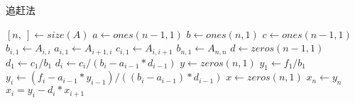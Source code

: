 \begin{breakablealgorithm}
    \caption{追赶法}
    \begin{algorithmic}[1]
        \STATE $[n, ~] \leftarrow size(A)$ 
        \STATE $a \leftarrow ones(n - 1, 1)$  
        \STATE $b \leftarrow ones(n, 1)$ 
        \STATE $c \leftarrow ones(n - 1, 1)$
        \STATE $b_{i, 1} \leftarrow A_{i, i}$
        \STATE $a_{i, 1} \leftarrow A_{i + 1, i}$
        \STATE $c_{i, 1} \leftarrow A_{i, i + 1}$
        \ENDFOR
        \STATE $b_{n, 1} \leftarrow A_{n, n}$
        \STATE $d \leftarrow zeros(n - 1, 1)$ 
        \STATE $d_1 \leftarrow c_1 / b_1$
        \STATE $d_i \leftarrow c_i / (b_i - a_{i - 1} * d_{i - 1})$
        \ENDFOR
        \STATE $y \leftarrow zeros(n, 1)$ 
        \STATE $y_1 \leftarrow f_1 / b_1$
        \STATE $y_i \leftarrow (f_i - a_{i - 1} * y_{i - 1}) / ((b_i - a_{i - 1}) * d_{i - 1})$
        \STATE $x \leftarrow zeros(n, 1)$ 
        \STATE $x_n \leftarrow y_n$
        \ENDFOR
        \STATE $x_i = y_i - d_i * x_{i + 1}$
        \ENDFOR
    \end{algorithmic}
\end{breakablealgorithm}
